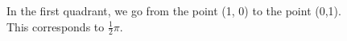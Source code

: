 \documentclass[preview]{standalone}
\begin{document}
\begin{center}
In the first quadrant, we go from the point (1, 0) to the point (0,1). \\ This corresponds to $\frac{1}{2} \pi$.
\end{center}
\end{document}
